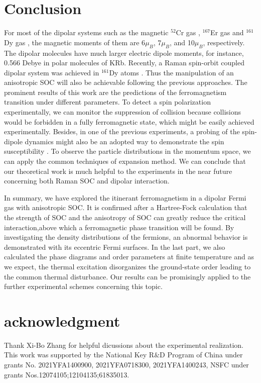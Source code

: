 \documentclass[twocolumn,english,pra,superscriptaddress]{revtex4-1}
\begin{document}
\section{Conclusion}
 For most of the dipolar systems such as the magnetic $^{52}$Cr gas \cite{PhysRevLett.95.150406}, $^{167}$Er gas \cite{aikawa2014observation} and $^{161}$Dy gas \cite{PhysRevLett.108.215301}, the magnetic moments of them are 6$\mu_{B}$, 7$\mu_{B}$, and 10$\mu_{B}$, respectively. The dipolar molecules have much larger electric dipole moments, for instance, 0.566 Debye in polar molecules of KRb. Recently, a Raman spin-orbit coupled dipolar system was achieved in $^{161}$Dy atoms \cite{PhysRevX.6.031022}. Thus the manipulation of an anisotropic SOC will also be achievable following the previous approaches. The prominent results of this work are the predictions of the ferromagnetism transition under different parameters. To detect a spin polarization experimentally, we can monitor the suppression of collision because collisions would be forbidden in a fully ferromagnetic state, which might be easily achieved experimentally. Besides, in one of the previous experiments, a probing of the spin-dipole dynamics might also be an adopted way to demonstrate the spin susceptibility \cite{RN28}. To observe the particle distributions in the momentum space, we can apply the common techniques of expansion method. We can conclude that our theoretical work is much helpful to the experiments in the near future concerning both Raman SOC and dipolar interaction. \par
 In summary, we have explored the itinerant ferromagnetism in a dipolar Fermi gas with anisotropic SOC. It is confirmed after a Hartree-Fock calculation that the strength of SOC and the anisotropy of SOC can greatly reduce the critical interaction,above which a ferromagnetic phase transition will be found. By investigating the density distributions of the fermions, an abnormal behavior is demonstrated with its eccentric Fermi surfaces. In the last part, we also calculated the phase diagrams and order parameters at finite temperature and as we expect, the thermal excitation disorganizes the ground-state order leading to the common thermal disturbance. Our results can be promisingly applied to the further experimental schemes concerning this topic.

\section{acknowledgment}
Thank Xi-Bo Zhang for helpful dicussions about the experimental realization. This work was supported by the National Key R$\&$D Program of China under grants No. 2021YFA1400900, 2021YFA0718300, 2021YFA1400243, NSFC under grants Nos.12074105;12104135;61835013.





\end{document}
